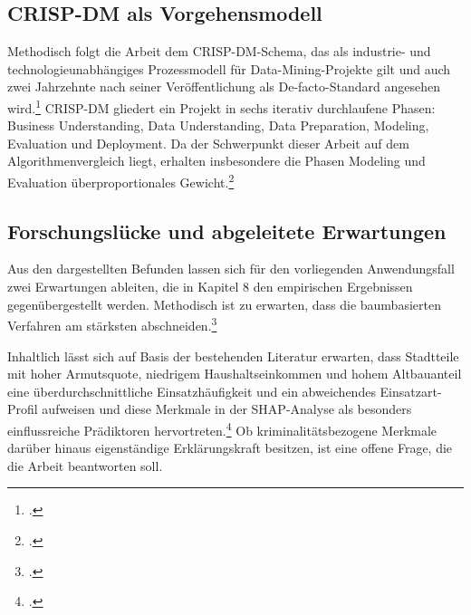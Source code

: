 \documentclass[12pt,a4paper]{article}
\begin{document}

\subsection{CRISP-DM als Vorgehensmodell}


Methodisch folgt die Arbeit dem CRISP-DM-Schema, das als industrie- und technologieunabhängiges
Prozessmodell für Data-Mining-Projekte gilt und auch zwei Jahrzehnte nach seiner Veröffentlichung
als De-facto-Standard angesehen wird.\footcite[1-2]{Wirth2000} CRISP-DM gliedert ein Projekt in
sechs iterativ durchlaufene Phasen: Business Understanding, Data Understanding, Data Preparation,
Modeling, Evaluation und Deployment. Da der Schwerpunkt dieser Arbeit auf dem Algorithmenvergleich
liegt, erhalten insbesondere die Phasen Modeling und Evaluation überproportionales
Gewicht.\footcite[526-532]{Schroeer2021}


\subsection{Forschungslücke und abgeleitete Erwartungen}


Aus den dargestellten Befunden lassen sich für den vorliegenden Anwendungsfall zwei Erwartungen
ableiten, die in Kapitel 8 den empirischen Ergebnissen gegenübergestellt werden. Methodisch ist zu
erwarten, dass die baumbasierten Verfahren am stärksten abschneiden.\footcite[9]{Grinsztajn2022}

Inhaltlich lässt sich auf Basis der bestehenden Literatur erwarten, dass Stadtteile mit hoher
Armutsquote, niedrigem Haushaltseinkommen und hohem Altbauanteil eine überdurchschnittliche
Einsatzhäufigkeit und ein abweichendes Einsatzart-Profil aufweisen und diese Merkmale in der
SHAP-Analyse als besonders einflussreiche Prädiktoren hervortreten.\footcite[27-28]{Jennings1999}
Ob kriminalitätsbezogene Merkmale darüber hinaus eigenständige Erklärungskraft besitzen, ist eine
offene Frage, die die Arbeit beantworten soll.
\end{document}
